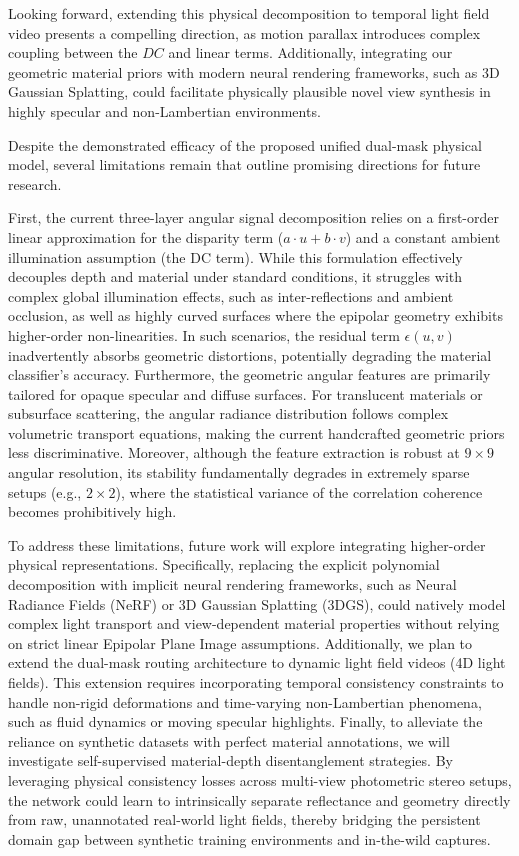Looking forward, extending this physical decomposition to temporal light field video presents a compelling direction, as motion parallax introduces complex coupling between the $DC$ and linear terms. Additionally, integrating our geometric material priors with modern neural rendering frameworks, such as 3D Gaussian Splatting, could facilitate physically plausible novel view synthesis in highly specular and non-Lambertian environments.

Despite the demonstrated efficacy of the proposed unified dual-mask physical model, several limitations remain that outline promising directions for future research. 

First, the current three-layer angular signal decomposition relies on a first-order linear approximation for the disparity term ($a\cdot u + b\cdot v$) and a constant ambient illumination assumption (the DC term). While this formulation effectively decouples depth and material under standard conditions, it struggles with complex global illumination effects, such as inter-reflections and ambient occlusion, as well as highly curved surfaces where the epipolar geometry exhibits higher-order non-linearities. In such scenarios, the residual term $\epsilon(u,v)$ inadvertently absorbs geometric distortions, potentially degrading the material classifier's accuracy. Furthermore, the geometric angular features are primarily tailored for opaque specular and diffuse surfaces. For translucent materials or subsurface scattering, the angular radiance distribution follows complex volumetric transport equations, making the current handcrafted geometric priors less discriminative. Moreover, although the feature extraction is robust at $9 \times 9$ angular resolution, its stability fundamentally degrades in extremely sparse setups (e.g., $2 \times 2$), where the statistical variance of the correlation coherence becomes prohibitively high.

To address these limitations, future work will explore integrating higher-order physical representations. Specifically, replacing the explicit polynomial decomposition with implicit neural rendering frameworks, such as Neural Radiance Fields (NeRF) or 3D Gaussian Splatting (3DGS), could natively model complex light transport and view-dependent material properties without relying on strict linear Epipolar Plane Image assumptions. Additionally, we plan to extend the dual-mask routing architecture to dynamic light field videos (4D light fields). This extension requires incorporating temporal consistency constraints to handle non-rigid deformations and time-varying non-Lambertian phenomena, such as fluid dynamics or moving specular highlights. Finally, to alleviate the reliance on synthetic datasets with perfect material annotations, we will investigate self-supervised material-depth disentanglement strategies. By leveraging physical consistency losses across multi-view photometric stereo setups, the network could learn to intrinsically separate reflectance and geometry directly from raw, unannotated real-world light fields, thereby bridging the persistent domain gap between synthetic training environments and in-the-wild captures.